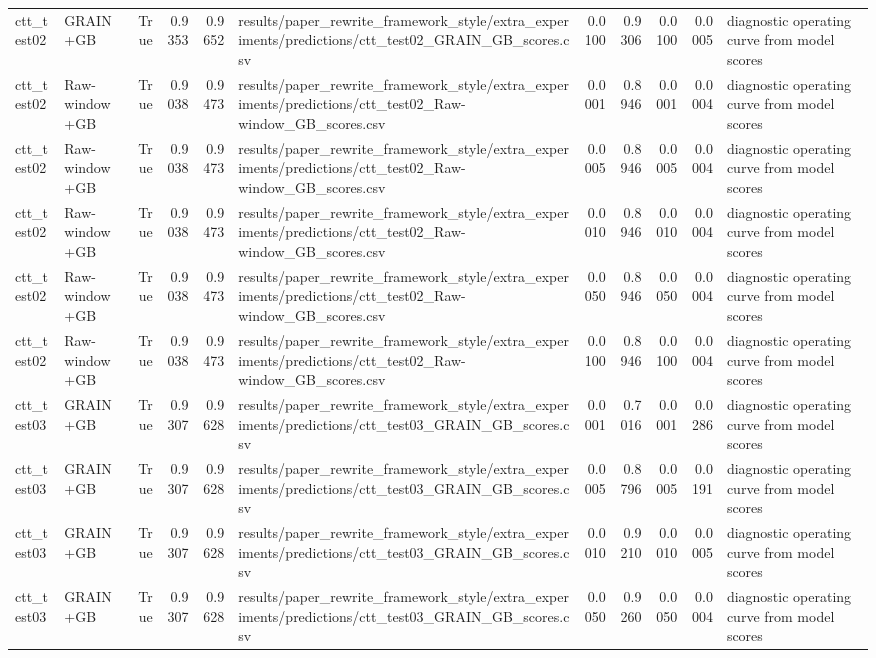 \begin{tabular}{llrrrlrrrrl}
ctt\_test02 & GRAIN+GB & True & 0.9353 & 0.9652 & results/paper\_rewrite\_framework\_style/extra\_experiments/predictions/ctt\_test02\_GRAIN\_GB\_scores.csv & 0.0100 & 0.9306 & 0.0100 & 0.0005 & diagnostic operating curve from model scores \\
ctt\_test02 & Raw-window+GB & True & 0.9038 & 0.9473 & results/paper\_rewrite\_framework\_style/extra\_experiments/predictions/ctt\_test02\_Raw-window\_GB\_scores.csv & 0.0001 & 0.8946 & 0.0001 & 0.0004 & diagnostic operating curve from model scores \\
ctt\_test02 & Raw-window+GB & True & 0.9038 & 0.9473 & results/paper\_rewrite\_framework\_style/extra\_experiments/predictions/ctt\_test02\_Raw-window\_GB\_scores.csv & 0.0005 & 0.8946 & 0.0005 & 0.0004 & diagnostic operating curve from model scores \\
ctt\_test02 & Raw-window+GB & True & 0.9038 & 0.9473 & results/paper\_rewrite\_framework\_style/extra\_experiments/predictions/ctt\_test02\_Raw-window\_GB\_scores.csv & 0.0010 & 0.8946 & 0.0010 & 0.0004 & diagnostic operating curve from model scores \\
ctt\_test02 & Raw-window+GB & True & 0.9038 & 0.9473 & results/paper\_rewrite\_framework\_style/extra\_experiments/predictions/ctt\_test02\_Raw-window\_GB\_scores.csv & 0.0050 & 0.8946 & 0.0050 & 0.0004 & diagnostic operating curve from model scores \\
ctt\_test02 & Raw-window+GB & True & 0.9038 & 0.9473 & results/paper\_rewrite\_framework\_style/extra\_experiments/predictions/ctt\_test02\_Raw-window\_GB\_scores.csv & 0.0100 & 0.8946 & 0.0100 & 0.0004 & diagnostic operating curve from model scores \\
ctt\_test03 & GRAIN+GB & True & 0.9307 & 0.9628 & results/paper\_rewrite\_framework\_style/extra\_experiments/predictions/ctt\_test03\_GRAIN\_GB\_scores.csv & 0.0001 & 0.7016 & 0.0001 & 0.0286 & diagnostic operating curve from model scores \\
ctt\_test03 & GRAIN+GB & True & 0.9307 & 0.9628 & results/paper\_rewrite\_framework\_style/extra\_experiments/predictions/ctt\_test03\_GRAIN\_GB\_scores.csv & 0.0005 & 0.8796 & 0.0005 & 0.0191 & diagnostic operating curve from model scores \\
ctt\_test03 & GRAIN+GB & True & 0.9307 & 0.9628 & results/paper\_rewrite\_framework\_style/extra\_experiments/predictions/ctt\_test03\_GRAIN\_GB\_scores.csv & 0.0010 & 0.9210 & 0.0010 & 0.0005 & diagnostic operating curve from model scores \\
ctt\_test03 & GRAIN+GB & True & 0.9307 & 0.9628 & results/paper\_rewrite\_framework\_style/extra\_experiments/predictions/ctt\_test03\_GRAIN\_GB\_scores.csv & 0.0050 & 0.9260 & 0.0050 & 0.0004 & diagnostic operating curve from model scores \\

\end{tabular}
